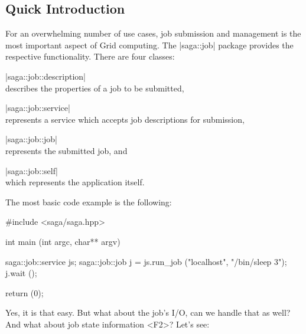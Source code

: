 
 \subsection{Quick Introduction}


  For an overwhelming number of use cases, job submission and
  management is the most important aspect of Grid computing.
  The |saga::job| package provides the respective functionality.
  There are four classes:

  \begin{shortlist}

   \item |saga::job::description|\\
         describes the properties of a job to be submitted, 

   \item |saga::job::service|\\
         represents a service which accepts job descriptions for
         submission, 

   \item |saga::job::job|\\
         represents the submitted job, and

   \item |saga::job::self|\\
         which represents the application itself.

  \end{shortlist}


  The most basic code example is the following:

  \begin{mycode}[label=Job submission]
  #include <saga/saga.hpp>

  int main (int argc, char** argv)
  {
    saga::job::service js;
    saga::job::job j = js.run_job ("localhost", "/bin/sleep 3");
    j.wait ();
  
    return (0);
  }
  \end{mycode}

  Yes, it is that easy.  But what about the job's I/O, can we handle
  that as well?  And what about job state information \textless F2\textgreater?  Let's see:

